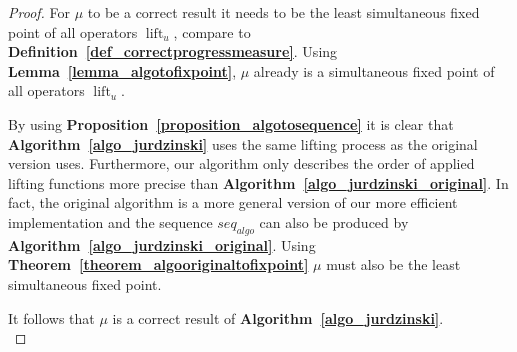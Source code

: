 \documentclass[12pt,oneside,bibliography=totoc,abstracton]{scrartcl}
\DeclareMathOperator{\lift}{lift}
\newcommand{\lemmaref}[1]{\textbf{Lemma~\ref{#1}}}
\newcommand{\theoremref}[1]{\textbf{Theorem~\ref{#1}}}
\newcommand{\propositionref}[1]{\textbf{Proposition~\ref{#1}}}
\newcommand{\algoref}[1]{\textbf{Algorithm~\ref{#1}}}
\newcommand{\defref}[1]{\textbf{Definition~\ref{#1}}}
\begin{document}
\begin{proof}
	For $\mu$ to be a correct result it needs to be the least simultaneous fixed point
	of all operators $\lift_u$, compare to \defref{def_correctprogressmeasure}.
	Using \lemmaref{lemma_algotofixpoint}, $\mu$ already is a simultaneous fixed point of
	all operators $\lift_u$.
	
	By using \propositionref{proposition_algotosequence} it is clear that \algoref{algo_jurdzinski}
	uses the same lifting process as the original version uses.
	Furthermore, our algorithm only describes the order of applied
	lifting functions more precise than \algoref{algo_jurdzinski_original}.
	In fact, the original algorithm is a more general version
	of our more efficient implementation and the sequence $\textit{seq}_{\textit{algo}}$
	can also be produced by \algoref{algo_jurdzinski_original}.
	Using \theoremref{theorem_algooriginaltofixpoint} $\mu$ must also be the
	least simultaneous fixed point.
	
	It follows that $\mu$ is a correct result of \algoref{algo_jurdzinski}.\\
\end{proof}

\end{document}
